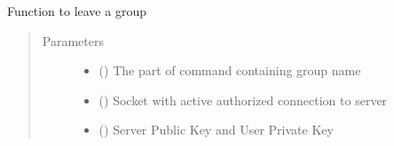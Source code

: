 \documentclass[letterpaper,10pt,english]{sphinxmanual}
\begin{document}
\begin{fulllineitems}
\label{\detokenize{userInputHandler:userInputHandler.leaveGroup}}
Function to leave a group
\begin{quote}\begin{description}
\item[{Parameters}] \leavevmode\begin{itemize}
\item {} 
 () \textendash{} The part of command containing group name

\item {} 
 () \textendash{} Socket with active authorized connection to server

\item {} 
 () \textendash{} Server Public Key and User Private Key

\end{itemize}

\end{description}\end{quote}

\end{fulllineitems}

\end{document}
